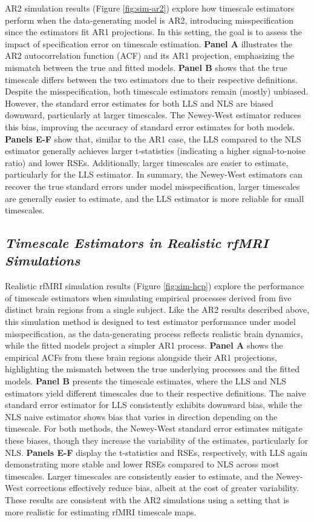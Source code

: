 \documentclass[latex/main.tex]{subfiles}
\begin{document}
AR2 simulation results (Figure \ref{fig:sim-ar2}) explore how timescale estimators perform when the data-generating model is AR2, introducing misspecification since the estimators fit AR1 projections. In this setting, the goal is to assess the impact of specification error on timescale estimation. \textbf{Panel A} illustrates the AR2 autocorrelation function (ACF) and its AR1 projection, emphasizing the mismatch between the true and fitted models. \textbf{Panel B} shows that the true timescale differs between the two estimators due to their respective definitions. Despite the misspecification, both timescale estimators remain (mostly) unbiased. However, the standard error estimates for both LLS and NLS are biased downward, particularly at larger timescales. The Newey-West estimator reduces this bias, improving the accuracy of standard error estimates for both models. \textbf{Panels E-F} show that, similar to the AR1 case, the LLS compared to the NLS estimator generally achieves larger t-statistics (indicating a higher signal-to-noise ratio) and lower RSEs. Additionally, larger timescales are easier to estimate, particularly for the LLS estimator. In summary, the Newey-West estimators can recover the true standard errors under model misspecification, larger timescales are generally easier to estimate, and the LLS estimator is more reliable for small timescales.

\subsection{\textit{Timescale Estimators in Realistic rfMRI Simulations}}

Realistic rfMRI simulation results (Figure \ref{fig:sim-hcp}) explore the performance of timescale estimators when simulating empirical processes derived from five distinct brain regions from a single subject. Like the AR2 results described above, this simulation method is designed to test estimator performance under model misspecification, as the data-generating process reflects realistic brain dynamics, while the fitted models project a simpler AR1 process. \textbf{Panel A} shows the empirical ACFs from these brain regions alongside their AR1 projections, highlighting the mismatch between the true underlying processes and the fitted models. \textbf{Panel B} presents the timescale estimates, where the LLS and NLS estimators yield different timescales due to their respective definitions. The naive standard error estimator for LLS consistently exhibits downward bias, while the NLS naive estimator shows bias that varies in direction depending on the timescale. For both methods, the Newey-West standard error estimates mitigate these biases, though they increase the variability of the estimates, particularly for NLS. \textbf{Panels E-F} display the t-statistics and RSEs, respectively, with LLS again demonstrating more stable and lower RSEs compared to NLS across most timescales. Larger timescales are consistently easier to estimate, and the Newey-West corrections effectively reduce bias, albeit at the cost of greater variability. These results are consistent with the AR2 simulations using a setting that is more realistic for estimating rfMRI timescale maps.
\end{document}
